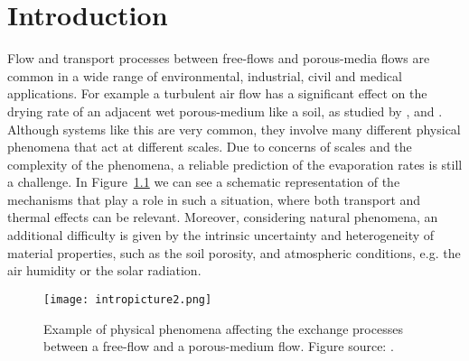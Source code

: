 \chapter{Introduction}
Flow and transport processes between free-flows and porous-media 
flows are common in a wide range of environmental, industrial, civil and medical 
applications.
For example a turbulent air flow has a significant effect on the 
drying rate of an adjacent wet porous-medium like a soil, as studied by  
\textcite{tesi:mosthaf}, \textcite{intro:davarzani} and \textcite  
{tesi:fetzer}.
Although systems like this are very common,	they involve
many different physical phenomena that act at 
different scales.
Due to concerns of scales and the complexity of the phenomena,
a reliable prediction of the evaporation rates is still a challenge. In Figure~\ref{fig:intro} we can 
see a schematic representation of the mechanisms that play a role in such a 
situation, where both transport and thermal effects can be relevant. 
Moreover, considering natural phenomena, an additional difficulty is given by 
the intrinsic uncertainty and heterogeneity of material properties, such as the 
soil porosity, and atmospheric conditions, e.g. the air humidity or the 
solar radiation.
\begin{figure}[ht]
	\centering
	\texttt{[image: intropicture2.png]}
	\caption[Exchange processes between free and porous-medium 
	flows]{Example of physical phenomena affecting the exchange processes 
		between a free-flow and a porous-medium flow. Figure source: 
		\cite{tesi:fetzer}.}
	\label{fig:intro}
\end{figure}

